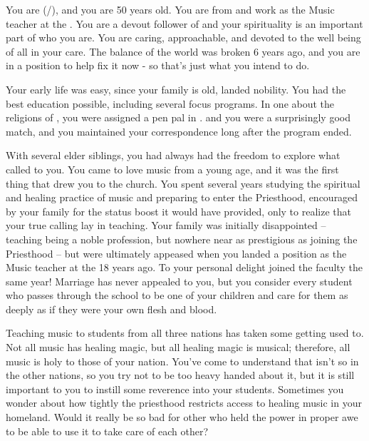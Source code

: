 \documentclass[char]{GL2020}
\begin{document}
\name{\cMusic{}}

You are \cMusic{\full} (\cMusic{\they}/\cMusic{\them}), and you are 50 years old. You are from \pFarm{} and work as the Music teacher at the \pSchool{}. You are a devout follower of \cFarmGod{} and your spirituality is an important part of who you are. You are caring, approachable, and devoted to the well being of all in your care. The balance of the world was broken 6 years ago, and you are in a position to help fix it now - so that's just what you intend to do.

Your early life was easy, since your family is old, landed nobility. You had the best education possible, including several focus programs. In one about the religions of \pEarth{}, you were assigned a pen pal in \pTech{}. \cBeetle{\full} and you were a surprisingly good match, and you maintained your correspondence long after the program ended.

With several elder siblings, you had always had the freedom to explore what called to you. You came to love music from a young age, and it was the first thing that drew you to the church. You spent several years studying the spiritual and healing practice of music and preparing to enter the Priesthood, encouraged by your family for the status boost it would have provided, only to realize that your true calling lay in teaching. Your family was initially disappointed -- teaching being a noble profession, but nowhere near as prestigious as joining the Priesthood -- but were ultimately appeased when you landed a position as the Music teacher at the \pSchool{} 18 years ago. To your personal delight \cBeetle{} joined the faculty the same year! Marriage has never appealed to you, but you consider every student who passes through the school to be one of your children and care for them as deeply as if they were your own flesh and blood.

Teaching music to students from all three nations has taken some getting used to. Not all music has healing magic, but all \pFarm{} healing magic is musical; therefore, all music is holy to those of your nation. You've come to understand that isn't so in the other nations, so you try not to be too heavy handed about it, but it is still important to you to instill some reverence into your students. Sometimes you wonder about how tightly the priesthood restricts access to healing music in your homeland. Would it really be so bad for other \pFarmers{} who held the power in proper awe to be able to use it to take care of each other?
\end{document}
